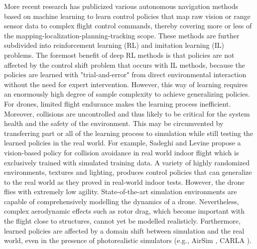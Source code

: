 More recent research has publicized 
various autonomous navigation methods based on machine learning
to learn control policies that map raw vision or range sensor data 
to complex flight control commands, thereby covering
more or less of the mapping-localization-planning-tracking scope.
These methods are further subdivided 
into reinforcement learning (RL) and imitation learning (IL) problems.
The foremost benefit of deep RL methods 
is that policies are not affected by 
the control shift problem that occurs with IL methods,
because the policies are learned with "trial-and-error" \cite{Sadeghi2016} 
from direct environmental interaction without the need for expert intervention.
However, this way of learning requires an 
enormously high degree of sample complexity 
to achieve generalizing policies. \cite{Zhu2017}
For drones, limited flight endurance 
makes the learning process inefficient. \cite{Sadeghi2016}
Moreover, collisions are uncontrolled 
and thus likely to be critical for the system 
health and the safety of the environment. \cite{Sadeghi2016}
This may be circumvented 
by transferring part or all of the learning process to simulation 
while still testing the learned policies in the real world. 
For example, Sadeghi and Levine \cite{Sadeghi2016} propose a vision-based policy 
for collision avoidance in real world indoor flight 
which is exclusively trained with simulated training data.
A variety of highly randomized environments, textures and lighting, 
produces control policies that can generalize to the real world
as they proved in real-world indoor tests.
However, the drone flies with extremely low agility.
State-of-the-art simulation environments are capable of 
comprehensively modelling the dynamics of a drone. \cite{Meyer2012}
Nevertheless, complex aerodynamic effects such as rotor drag, 
which become important with the flight 
close to structures, cannot yet be modelled realisticly. \cite{Faessler2018}
Furthermore, learned policies are affected by a domain shift 
between simulation and the real world,
even in the presence of photorealistic simulators 
(e.g., AirSim \cite{Shah2017}, CARLA \cite{Dosovitskiy2017}).

